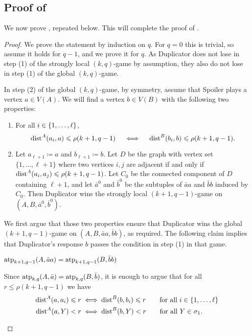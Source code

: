 \subsection{Proof of }\label{sec:lemmain-proof}
We now prove , repeated below. This will complete the proof of .
\lemmain*

\begin{proof}
    We prove the statement by induction on \(q\).
    For \(q=0\) this is trivial, so assume it holds for \(q-1\), and we prove it for \(q\).
    As Duplicator  does not lose in step (1) of the strongly local \((k,q)\)-game by assumption, they also do not lose in step (1) of the global \((k,q)\)-game. 
    
In step (2) of the global \((k,q)\)-game,
    by symmetry, assume that Spoiler plays a vertex \(a \in V(A)\).
    We will find a vertex \(b\in V(B)\)
    with the following two properties: 
    \begin{enumerate}[label=({\itshape\roman*})]
        \item\label{cond:dist}  For all  $i \in\{1,\ldots, \ell\}$,
        \begin{equation*}%
            \dist^A(a_i,a) \le \rho(k+1,q-1) \quad\iff\quad \dist^B(b_i,b) \le \rho(k+1,q-1) .
         \end{equation*}
        
         \item\label{cond:win} Let \(a_{\ell+1}\coloneqq a\) and \(b_{\ell+1} \coloneqq  b\).
         Let \(D\) be the graph
            with vertex set \(\{1,\dots,\ell+1\}\) where two vertices \(i,j\) are adjacent
            if and only if \(\mathrm{dist}^A(a_i,a_j) \leqslant \rho(k+1,q-1)\).
            Let $C_0$ be
            the connected component of $D$ containing $\ell+1$, and let 
            $\bar a^0$ and $\bar b^0$ be the subtuples of $\bar a a$ and $\bar bb$ induced by $C_0$.
            Then Duplicator wins the strongly local $(k+1,q-1)$-game on $(A,B,\bar a^0,\bar b^0)$.
    \end{enumerate}
     
    \noindent
We first argue that those two properties 
ensure that Duplicator wins the global $(k+1,q-1)$-game on $(A,B,\bar aa,\bar bb)$, as required. 
The following claim implies that  Duplicator's response $b$ passes the condition in step (1) in that game.
\begin{claim}\label{cl:step1}
    $\textnormal{atp}_{k+1,q-1}(A, \bar aa)=\textnormal{atp}_{k+1,q-1}(B, \bar bb)$
\end{claim}
\begin{claimproof}
Since $\textnormal{atp}_{k,q}(A, \bar a)=\textnormal{atp}_{k,q}(B, \bar b)$,
 it is enough to argue that for all $r\le \rho(k+1,q-1)$ we have
\begin{align}
    \mathrm{dist}^A(a,a_i)\leqslant r&\iff \mathrm{dist}^B(b,b_i)\leqslant r\label{eq:dist-atom1}\qquad\text{for all $i\in\{1,\ldots,\ell\}$}\\
    \mathrm{dist}^A(a,Y)< r&\iff \mathrm{dist}^B(b,Y)< r\label{eq:dist-atom2}\qquad\text{for all $Y\in\sigma_1$}.
\end{align}


\end{claimproof}
\end{proof}
